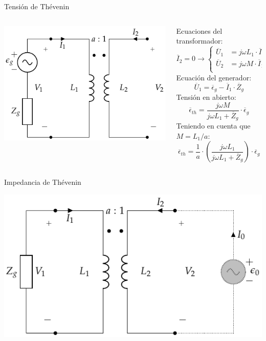 \documentclass[xcolor={usenames,svgnames,dvipsnames}]{beamer}
\begin{document}
\begin{frame}[label={sec:orgcc8429b}]{Tensión de Thévenin}
\begin{columns}
\begin{column}{0.4\columnwidth}
\begin{center}
\includegraphics[width=.9\linewidth]{../figs/Trafo_Perfecto_FuentePrimario.pdf}
\end{center}
\end{column}
\begin{column}{0.6\columnwidth}
Ecuaciones del transformador:
\[
  \overline{I}_2 = 0
  \rightarrow
  \left\{
    \begin{array}{ll}
      \overline{U}_1 &= j \omega L_1 \cdot \overline{I}_1\\
      \overline{U}_2 &= j \omega M \cdot \overline{I}_1\\
    \end{array}\right.
\]
Ecuación del generador:
\[
  \overline{U}_1 = \overline{\epsilon}_g - \overline{I}_1 \cdot \overline{Z}_g
\]
Tensión en abierto:
\[
  \overline{\epsilon}_{th} = \frac{j\omega M}{j\omega L_1 + \overline{Z}_g} \cdot \overline{\epsilon}_g
\]
Teniendo en cuenta que \(M = L_1/a\):
\[
  \overline{\epsilon}_{th} = \frac{1}{a} \cdot \left(\frac{j\omega L_1}{j\omega L_1 + \overline{Z}_g}\right) \cdot \overline{\epsilon}_g
\]
\end{column}
\end{columns}
\end{frame}
\begin{frame}[label={sec:org58da8ce}]{Impedancia de Thévenin}
\begin{center}
\includegraphics[width=.9\linewidth]{../figs/Trafo_Perfecto_ImpedanciaPrimario.pdf}
\end{center}
\end{frame}
\end{document}
